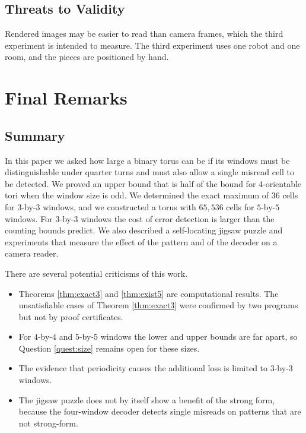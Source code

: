 \documentclass{lipics-v2021}
\begin{document}
\subsection{Threats to Validity}
\label{sec:experiments_threats}

Rendered images may be easier to read than camera frames, which the third experiment is intended to measure.
The third experiment uses one robot and one room, and the pieces are positioned by hand.


\section{Final Remarks}
\label{sec:final}

\subsection{Summary}
\label{sec:final_summary}

In this paper we asked how large a binary torus can be if its windows must be distinguishable under quarter turns and must also allow a single misread cell to be detected.
We proved an upper bound that is half of the bound for 4-orientable tori when the window size is odd.
We determined the exact maximum of $36$ cells for $3$-by-$3$ windows, and we constructed a torus with $65{,}536$ cells for $5$-by-$5$ windows.
For $3$-by-$3$ windows the cost of error detection is larger than the counting bounds predict.
We also described a self-locating jigsaw puzzle and experiments that measure the effect of the pattern and of the decoder on a camera reader.

There are several potential criticisms of this work.
\begin{itemize}
  \item Theorems \ref{thm:exact3} and \ref{thm:exist5} are computational results. The unsatisfiable cases of Theorem \ref{thm:exact3} were confirmed by two programs but not by proof certificates.
  \item For $4$-by-$4$ and $5$-by-$5$ windows the lower and upper bounds are far apart, so Question \ref{quest:size} remains open for these sizes.
  \item The evidence that periodicity causes the additional loss is limited to $3$-by-$3$ windows.
  \item The jigsaw puzzle does not by itself show a benefit of the strong form, because the four-window decoder detects single misreads on patterns that are not strong-form.
\end{itemize}
\end{document}
